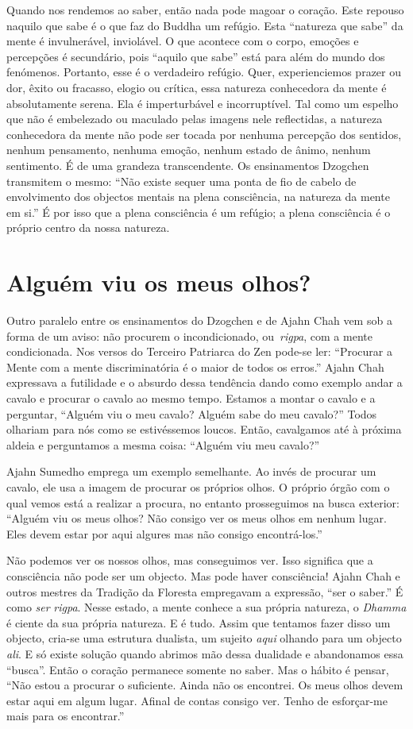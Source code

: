 Quando nos rendemos ao saber, então nada pode magoar o coração. Este
repouso naquilo que sabe é o que faz do Buddha um refúgio. Esta
``natureza que sabe'' da mente é invulnerável, inviolável. O que
acontece com o corpo, emoções e percepções é secundário, pois ``aquilo
que sabe'' está para além do mundo dos fenómenos. Portanto, esse é o
verdadeiro refúgio. Quer, experienciemos prazer ou dor, êxito ou
fracasso, elogio ou crítica, essa natureza conhecedora da mente é
absolutamente serena. Ela é imperturbável e incorruptível. Tal como um
espelho que não é embelezado ou maculado pelas imagens nele reflectidas,
a natureza conhecedora da mente não pode ser tocada por nenhuma
percepção dos sentidos, nenhum pensamento, nenhuma emoção, nenhum estado
de ânimo, nenhum sentimento. É de uma grandeza transcendente. Os
ensinamentos Dzogchen transmitem o mesmo: ``Não existe sequer uma ponta
de fio de cabelo de envolvimento dos objectos mentais na plena
consciência, na natureza da mente em si.'' É por isso que a plena
consciência é um refúgio; a plena consciência é o próprio centro da
nossa natureza.

\section{Alguém viu os meus olhos?}

Outro paralelo entre os ensinamentos do Dzogchen e de Ajahn Chah vem sob
a forma de um aviso: não procurem o incondicionado, ou~\emph{rigpa}, com
a mente condicionada. Nos versos do Terceiro Patriarca do Zen pode-se
ler: ``Procurar a Mente com a mente discriminatória é o maior de todos
os erros.'' Ajahn Chah expressava a futilidade e o absurdo dessa
tendência dando como exemplo andar a cavalo e procurar o cavalo ao mesmo
tempo. Estamos a montar o cavalo e a perguntar, ``Alguém viu o meu
cavalo? Alguém sabe do meu cavalo?'' Todos olhariam para nós como se
estivéssemos loucos. Então, cavalgamos até à próxima aldeia e
perguntamos a mesma coisa: ``Alguém viu meu cavalo?''

Ajahn Sumedho emprega um exemplo semelhante. Ao invés de procurar um
cavalo, ele usa a imagem de procurar os próprios olhos. O próprio órgão
com o qual vemos está a realizar a procura, no entanto prosseguimos na
busca exterior: ``Alguém viu os meus olhos? Não consigo ver os meus
olhos em nenhum lugar. Eles devem estar por aqui algures mas não consigo
encontrá-los.''

Não podemos ver os nossos olhos, mas conseguimos ver. Isso significa que
a consciência não pode ser um objecto. Mas pode haver consciência! Ajahn
Chah e outros mestres da Tradição da Floresta empregavam a expressão,
``ser o saber.'' É como \emph{ser} \emph{rigpa}. Nesse estado, a mente
conhece a sua própria natureza, o \emph{Dhamma} é ciente da sua própria
natureza. E é tudo. Assim que tentamos fazer disso um objecto, cria-se
uma estrutura dualista, um sujeito \emph{aqui} olhando para um objecto
\emph{ali}. E só existe solução quando abrimos mão dessa dualidade e
abandonamos essa ``busca''. Então o coração permanece somente no saber.
Mas o hábito é pensar, ``Não estou a procurar o suficiente. Ainda não os
encontrei. Os meus olhos devem estar aqui em algum lugar. Afinal de
contas consigo ver. Tenho de esforçar-me mais para os encontrar.''

